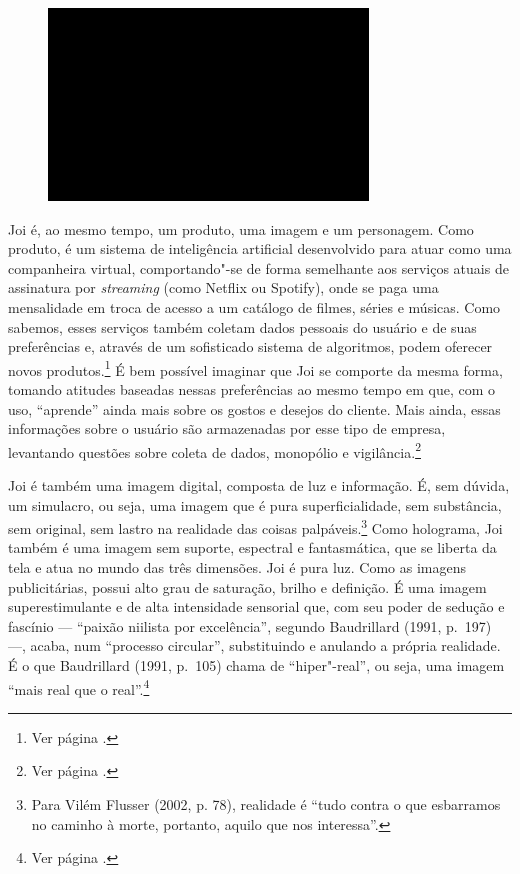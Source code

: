 \begin{figure}[!ht]

\centering
 \includegraphics[width=85mm]{./imgs/im1.jpg}
\caption{\tiny{}}

\end{figure}


Joi é, ao mesmo tempo, um produto, uma imagem e um personagem. Como
produto, é um sistema de inteligência artificial desenvolvido para atuar
como uma companheira virtual, comportando"-se de forma semelhante aos
serviços atuais de assinatura por \emph{streaming} (como Netflix ou
Spotify), onde se paga uma mensalidade em troca de acesso a um catálogo
de filmes, séries e músicas. Como sabemos, esses serviços também coletam
dados pessoais do usuário e de suas preferências e, através de um
sofisticado sistema de algoritmos, podem oferecer novos
produtos.\footnote{Ver página \pageref{algorismos}.} É bem possível imaginar que Joi se
comporte da mesma forma, tomando atitudes baseadas nessas preferências
ao mesmo tempo em que, com o uso, ``aprende'' ainda mais sobre os gostos
e desejos do cliente. Mais ainda, essas informações sobre o usuário são
armazenadas por esse tipo de empresa, levantando questões sobre coleta
de dados, monopólio e vigilância.\footnote{Ver página \pageref{vigilancia}.}

Joi é também uma imagem digital, composta de luz e informação. É, sem
dúvida, um simulacro, ou seja, uma imagem que é pura superficialidade,
sem substância, sem original, sem lastro na realidade das coisas
palpáveis.\footnote{Para Vilém Flusser (2002, p. 78), realidade é ``tudo
  contra o que esbarramos no caminho à morte, portanto, aquilo que nos
  interessa''.} Como holograma, Joi também é uma imagem sem suporte,
espectral e fantasmática, que se liberta da tela e atua no mundo das
três dimensões. Joi é pura luz. Como as imagens publicitárias, possui
alto grau de saturação, brilho e definição. É uma imagem
superestimulante e de alta intensidade sensorial que, com seu poder de
sedução e fascínio --- ``paixão niilista por excelência'', segundo
Baudrillard (1991, p.~197) ---, acaba, num ``processo circular'',
substituindo e anulando a própria realidade. É o que Baudrillard (1991, p.~105) chama de ``hiper"-real'', ou seja, uma imagem ``mais real que o
real''.\footnote{Ver página \pageref{hiperreal}.}

